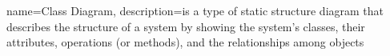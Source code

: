 %
%
 {
     name={Class Diagram},
     description={is a type of static structure diagram that describes the structure of a system by showing the system's classes, their attributes, operations (or methods), and the relationships among objects}
}
%
%
%
